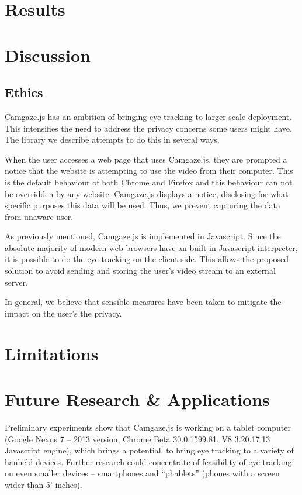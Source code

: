 \documentclass[annual]{acmsiggraph}
\begin{document}
\section{Results}

\section{Discussion}

\subsection{Ethics}

Camgaze.js has an ambition of bringing eye tracking to larger-scale deployment.
This intensifies the need to address the privacy concerns some users might
have. The library we describe attempts to do this in several ways.

When the user accesses a web page that uses Camgaze.js, they are prompted a
notice that the website is attempting to use the video from their computer.
This is the default behaviour of both Chrome and Firefox and this behaviour can
not be overridden by any website. Camgaze.js displays a notice, disclosing for
what specific purposes this data will be used. Thus, we prevent capturing the
data from unaware user.


As previously mentioned, Camgaze.js is implemented in Javascript. Since the
absolute majority of modern web browsers have an built-in Javascript
interpreter, it is possible to do the eye tracking on the client-side. This
allows the proposed solution to avoid sending and storing the user’s video
stream to an external server.

In general, we believe that sensible measures have been taken to mitigate the
impact on the user’s the privacy.


\section{Limitations}

\section{Future Research \& Applications}

Preliminary experiments show that Camgaze.js is working on a tablet computer
(Google Nexus 7 -- 2013 version, Chrome Beta 30.0.1599.81, V8 3.20.17.13
Javascript engine), which brings a potentiall to bring eye tracking to a
variety of hanheld devices. Further research could concentrate of feasibility
of eye tracking on even smaller devices -- smartphones and “phablets” (phones
with a screen wider than 5’ inches).
\end{document}
